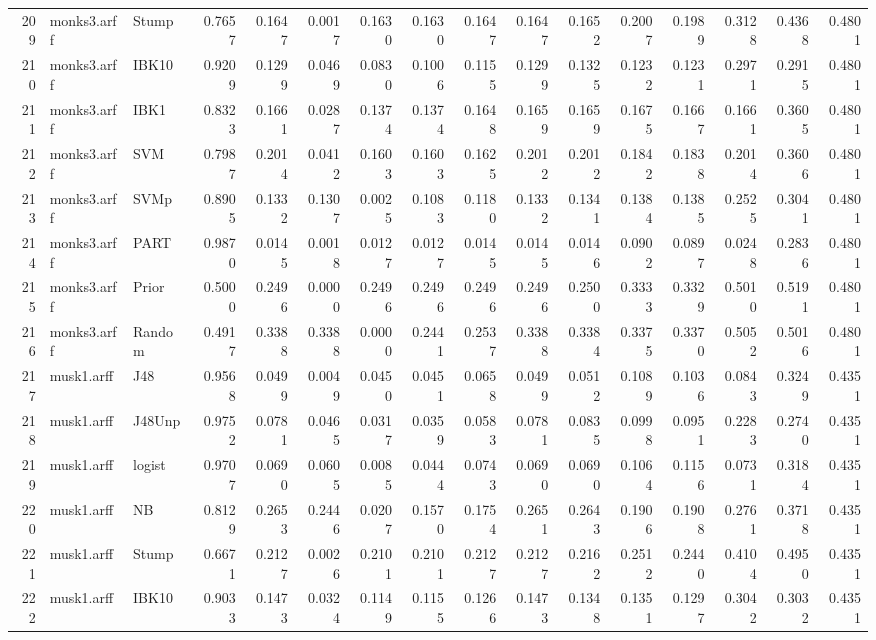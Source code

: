 \documentclass {article}
\begin{document}
\begin{table}[ht]
\begin{tabular}{rllrrrrrrrrrrrrr}
  209 & monks3.arff & Stump & 0.7657 & 0.1647 & 0.0017 & 0.1630 & 0.1630 & 0.1647 & 0.1647 & 0.1652 & 0.2007 & 0.1989 & 0.3128 & 0.4368 & 0.4801 \\ 
  210 & monks3.arff & IBK10 & 0.9209 & 0.1299 & 0.0469 & 0.0830 & 0.1006 & 0.1155 & 0.1299 & 0.1325 & 0.1232 & 0.1231 & 0.2971 & 0.2915 & 0.4801 \\ 
  211 & monks3.arff & IBK1 & 0.8323 & 0.1661 & 0.0287 & 0.1374 & 0.1374 & 0.1648 & 0.1659 & 0.1659 & 0.1675 & 0.1667 & 0.1661 & 0.3605 & 0.4801 \\ 
  212 & monks3.arff & SVM & 0.7987 & 0.2014 & 0.0412 & 0.1603 & 0.1603 & 0.1625 & 0.2012 & 0.2012 & 0.1842 & 0.1838 & 0.2014 & 0.3606 & 0.4801 \\ 
  213 & monks3.arff & SVMp & 0.8905 & 0.1332 & 0.1307 & 0.0025 & 0.1083 & 0.1180 & 0.1332 & 0.1341 & 0.1384 & 0.1385 & 0.2525 & 0.3041 & 0.4801 \\ 
  214 & monks3.arff & PART & 0.9870 & 0.0145 & 0.0018 & 0.0127 & 0.0127 & 0.0145 & 0.0145 & 0.0146 & 0.0902 & 0.0897 & 0.0248 & 0.2836 & 0.4801 \\ 
  215 & monks3.arff & Prior & 0.5000 & 0.2496 & 0.0000 & 0.2496 & 0.2496 & 0.2496 & 0.2496 & 0.2500 & 0.3333 & 0.3329 & 0.5010 & 0.5191 & 0.4801 \\ 
  216 & monks3.arff & Random & 0.4917 & 0.3388 & 0.3388 & 0.0000 & 0.2441 & 0.2537 & 0.3388 & 0.3384 & 0.3375 & 0.3370 & 0.5052 & 0.5016 & 0.4801 \\ 
  217 & musk1.arff & J48 & 0.9568 & 0.0499 & 0.0049 & 0.0450 & 0.0451 & 0.0658 & 0.0499 & 0.0512 & 0.1089 & 0.1036 & 0.0843 & 0.3249 & 0.4351 \\ 
  218 & musk1.arff & J48Unp & 0.9752 & 0.0781 & 0.0465 & 0.0317 & 0.0359 & 0.0583 & 0.0781 & 0.0835 & 0.0998 & 0.0951 & 0.2283 & 0.2740 & 0.4351 \\ 
  219 & musk1.arff & logist & 0.9707 & 0.0690 & 0.0605 & 0.0085 & 0.0444 & 0.0743 & 0.0690 & 0.0690 & 0.1064 & 0.1156 & 0.0731 & 0.3184 & 0.4351 \\ 
  220 & musk1.arff & NB & 0.8129 & 0.2653 & 0.2446 & 0.0207 & 0.1570 & 0.1754 & 0.2651 & 0.2643 & 0.1906 & 0.1908 & 0.2761 & 0.3718 & 0.4351 \\ 
  221 & musk1.arff & Stump & 0.6671 & 0.2127 & 0.0026 & 0.2101 & 0.2101 & 0.2127 & 0.2127 & 0.2162 & 0.2512 & 0.2440 & 0.4104 & 0.4950 & 0.4351 \\ 
  222 & musk1.arff & IBK10 & 0.9033 & 0.1473 & 0.0324 & 0.1149 & 0.1155 & 0.1266 & 0.1473 & 0.1348 & 0.1351 & 0.1297 & 0.3042 & 0.3032 & 0.4351 \\ 

\end{tabular}
\end{table}
\end{document}
